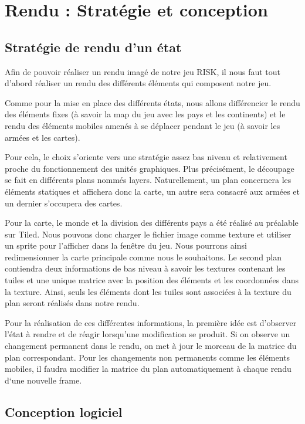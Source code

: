 \section{Rendu : Stratégie et conception}

\subsection{Stratégie de rendu d'un état}

Afin de pouvoir réaliser un rendu imagé de notre jeu RISK, il nous faut tout d’abord réaliser un rendu des différents éléments qui composent notre jeu. 

Comme pour la mise en place des différents états, nous allons différencier le rendu des éléments fixes (à savoir la map du jeu avec les pays et les continents) et le rendu des éléments mobiles amenés à se déplacer pendant le jeu (à savoir les armées et les cartes). 

Pour cela, le choix s'oriente vers une stratégie assez bas niveau et relativement proche du fonctionnement des unités graphiques. Plus précisément, le découpage se fait en différents plans nommés layers. Naturellement, un plan concernera les éléments statiques et affichera donc la carte, un autre sera consacré aux armées et un dernier s'occupera des cartes.

Pour la carte, le monde et la division des différents pays a été réalisé au préalable sur Tiled. Nous pouvons donc charger le fichier image comme texture et utiliser un sprite pour l'afficher dans la fenêtre du jeu. Nous pourrons ainsi redimensionner la carte principale comme nous le souhaitons.
Le second plan contiendra deux informations de bas niveau à savoir les textures contenant les tuiles et une unique matrice avec la position des éléments et les coordonnées dans la texture. Ainsi, seuls les éléments dont les tuiles sont associées à la texture du plan seront réalisés dans notre rendu. 

Pour la réalisation de ces différentes informations, la première idée est d’observer l’état à rendre et de réagir lorsqu’une modification se produit. Si on observe un changement permanent dans le rendu, on met à jour le morceau de la matrice du plan correspondant. Pour les changements non permanents comme les éléments mobiles, il faudra modifier la matrice du plan automatiquement à chaque rendu d‘une nouvelle frame.


\subsection{Conception logiciel}

